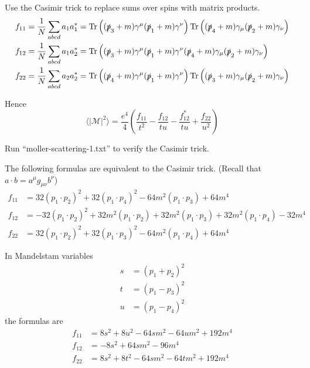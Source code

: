 \documentclass[12pt]{article}
\begin{document}
\noindent
Use the Casimir trick to replace sums over spins with matrix products.
\begin{align*}
f_{11}&=\frac{1}{N}\sum_{abcd}a_1a_1^*=
\mathop{\rm Tr}\left(
(\slashed{p}_3+m)\gamma^\mu(\slashed{p}_1+m)\gamma^\nu
\right)
\mathop{\rm Tr}\left(
(\slashed{p}_4+m)\gamma_\mu(\slashed{p}_2+m)\gamma_\nu
\right)
\\
f_{12}&=\frac{1}{N}\sum_{abcd}a_1a_2^*=
\mathop{\rm Tr}\left(
(\slashed{p}_3+m)\gamma^\mu(\slashed{p}_1+m)\gamma^\nu
(\slashed{p}_4+m)\gamma_\mu(\slashed{p}_2+m)\gamma_\nu
\right)
\\
f_{22}&=\frac{1}{N}\sum_{abcd}a_2a_2^*=
\mathop{\rm Tr}\left(
(\slashed{p}_4+m)\gamma^\mu(\slashed{p}_1+m)\gamma^\nu
\right)
\mathop{\rm Tr}\left(
(\slashed{p}_3+m)\gamma_\mu(\slashed{p}_2+m)\gamma_\nu
\right)
\end{align*}

\noindent
Hence
\begin{equation*}
\langle|\mathcal{M}|^2\rangle
=\frac{e^4}{4}
\left(
\frac{f_{11}}{t^2}-\frac{f_{12}}{tu}-\frac{f_{12}^*}{tu}+\frac{f_{22}}{u^2}
\right)
\end{equation*}

\noindent
Run ``moller-scattering-1.txt'' to verify the Casimir trick.

\bigskip
\noindent
The following formulas are equivalent to the Casimir trick.
(Recall that $a\cdot b=a^\mu g_{\mu\nu}b^\nu$)
\begin{align*}
f_{11}&=
32 (p_1\cdot p_2)^2 +
32 (p_1\cdot p_4)^2 -
64 m^2 (p_1\cdot p_3) + 64 m^4
\\
f_{12}&=
-32 (p_1\cdot p_2)^2 +
32 m^2 (p_1\cdot p_2) +
32 m^2 (p_1\cdot p_3) +
32 m^2 (p_1\cdot p_4) - 32m^4
\\
f_{22}&=
32 (p_1\cdot p_2)^2 +
32 (p_1\cdot p_3)^2 -
64 m^2 (p_1\cdot p_4) + 64 m^4
\end{align*}

\noindent
In Mandelstam variables
\begin{align*}
s&=(p_1+p_2)^2
\\
t&=(p_1-p_3)^2
\\
u&=(p_1-p_4)^2
\end{align*}
the formulas are
\begin{align*}
f_{11} &= 8 s^2 + 8 u^2 - 64 s m^2 - 64 u m^2 + 192 m^4
\\
f_{12} &= -8 s^2 + 64 s m^2 - 96 m^4
\\
f_{22} &= 8 s^2 + 8 t^2 - 64 s m^2 - 64 t m^2 + 192 m^4
\end{align*}
\end{document}
